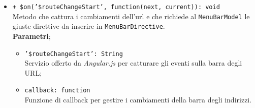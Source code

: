 \begin{itemize}
\begin{itemize}
		\item \texttt{+ \$on('\$routeChangeStart', function(next, current)): void} \\
		Metodo che cattura i cambiamenti dell'url e che richiede al \texttt{MenuBarModel} le giuste direttive da inserire in \texttt{MenuBarDirective}.\\
		\textbf{Parametri};
		\begin{itemize}
			\item \texttt{'\$routeChangeStart': String}	\\ Servizio offerto da \textit{Angular.js} per catturare gli eventi sulla barra degli URL;
			\item \texttt{callback: function}	\\ Funzione di callback per gestire i cambiamenti della barra degli indirizzi.
		\end{itemize}
	\end{itemize}
	
\end{itemize}